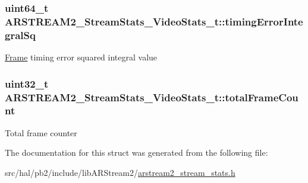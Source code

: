 \subsubsection[{\texorpdfstring{timing\+Error\+Integral\+Sq}{timingErrorIntegralSq}}]{\setlength{\rightskip}{0pt plus 5cm}uint64\+\_\+t A\+R\+S\+T\+R\+E\+A\+M2\+\_\+\+Stream\+Stats\+\_\+\+Video\+Stats\+\_\+t\+::timing\+Error\+Integral\+Sq}\hypertarget{struct_a_r_s_t_r_e_a_m2___stream_stats___video_stats__t_ab7cfe2dc93ec647c2a9e939d68f35144}{}\label{struct_a_r_s_t_r_e_a_m2___stream_stats___video_stats__t_ab7cfe2dc93ec647c2a9e939d68f35144}
\hyperlink{struct_frame}{Frame} timing error squared integral value 
\subsubsection[{\texorpdfstring{total\+Frame\+Count}{totalFrameCount}}]{\setlength{\rightskip}{0pt plus 5cm}uint32\+\_\+t A\+R\+S\+T\+R\+E\+A\+M2\+\_\+\+Stream\+Stats\+\_\+\+Video\+Stats\+\_\+t\+::total\+Frame\+Count}\hypertarget{struct_a_r_s_t_r_e_a_m2___stream_stats___video_stats__t_a80c9e29d4ca781fa588982e117241012}{}\label{struct_a_r_s_t_r_e_a_m2___stream_stats___video_stats__t_a80c9e29d4ca781fa588982e117241012}
Total frame counter 

The documentation for this struct was generated from the following file\+:\begin{DoxyCompactItemize}
\item 
src/hal/pb2/include/lib\+A\+R\+Stream2/\hyperlink{arstream2__stream__stats_8h}{arstream2\+\_\+stream\+\_\+stats.\+h}\end{DoxyCompactItemize}
